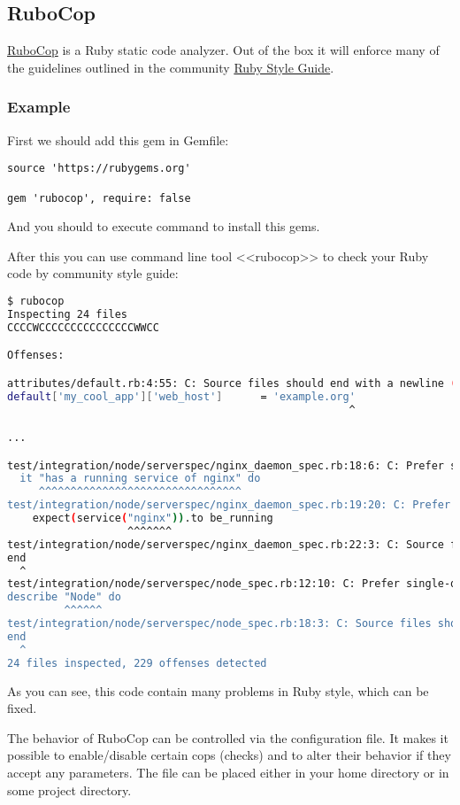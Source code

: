 \subsection{RuboCop}

\href{https://github.com/bbatsov/rubocop}{RuboCop} is a Ruby static code analyzer. Out of the box it will enforce many of the guidelines outlined in the community \href{https://github.com/bbatsov/ruby-style-guide}{Ruby Style Guide}.

\subsubsection{Example}

First we should add this gem in Gemfile:

\begin{lstlisting}[label=lst:testing-test-kitchen1]
source 'https://rubygems.org'

gem 'rubocop', require: false
\end{lstlisting}

And you should to execute  command to install this gems.

After this you can use command line tool <<rubocop>> to check your Ruby code by community style guide:

\begin{lstlisting}[language=Bash,label=lst:testing-robocop1]
$ rubocop
Inspecting 24 files
CCCCWCCCCCCCCCCCCCCCWWCC

Offenses:

attributes/default.rb:4:55: C: Source files should end with a newline (\n).
default['my_cool_app']['web_host']      = 'example.org'
                                                      ^

...

test/integration/node/serverspec/nginx_daemon_spec.rb:18:6: C: Prefer single-quoted strings when you don't need string interpolation or special symbols.
  it "has a running service of nginx" do
     ^^^^^^^^^^^^^^^^^^^^^^^^^^^^^^^^
test/integration/node/serverspec/nginx_daemon_spec.rb:19:20: C: Prefer single-quoted strings when you don't need string interpolation or special symbols.
    expect(service("nginx")).to be_running
                   ^^^^^^^
test/integration/node/serverspec/nginx_daemon_spec.rb:22:3: C: Source files should end with a newline (\n).
end
  ^
test/integration/node/serverspec/node_spec.rb:12:10: C: Prefer single-quoted strings when you don't need string interpolation or special symbols.
describe "Node" do
         ^^^^^^
test/integration/node/serverspec/node_spec.rb:18:3: C: Source files should end with a newline (\n).
end
  ^
24 files inspected, 229 offenses detected
\end{lstlisting}

As you can see, this code contain many problems in Ruby style, which can be fixed.

The behavior of RuboCop can be controlled via the  configuration file. It makes it possible to enable/disable certain cops (checks) and to alter their behavior if they accept any parameters. The file can be placed either in your home directory or in some project directory.
